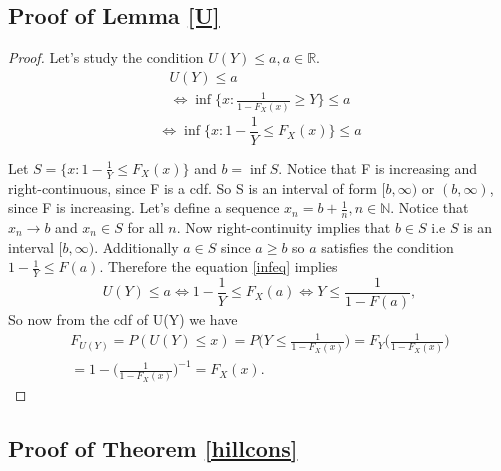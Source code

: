\documentclass[english,12pt,a4paper,pdftex,sci,utf8]{aaltothesis} %
\begin{document}
\subsection{Proof of Lemma \ref{U}}

\begin{proof}
Let's study the condition $U(Y) \leq a, a \in \mathbb{R} $.
\begin{equation*}
\begin{split}
U(Y) \leq a \\
\Leftrightarrow \inf\big\{x: \frac{1}{1-F_X(x)} \geq Y\big\} \leq a
\end{split}
\end{equation*}
\begin{equation}
\Leftrightarrow \inf\big\{x: 1 - \frac{1}{Y} \leq F_X(x)\big\} \leq a
\label{infeq}
\end{equation}


Let $S=\big\{x: 1 - \frac{1}{Y} \leq F_X(x)\big\}$ and $b = \inf S$. Notice that F is increasing and right-continuous, since F is a cdf. So S is an interval of form $[b,\infty)$ or $(b, \infty)$, since F is increasing. Let's define a sequence $x_n=b+\frac{1}{n}, n\in \mathbb{N}$. Notice that $x_n \rightarrow b$ and $x_n \in S$ for all $n$. Now right-continuity implies that $b \in S$ i.e $S$ is an interval $[b, \infty)$. Additionally $a \in S$ since $a\geq b$ so $a$ satisfies the condition $1-\frac{1}{Y} \leq F(a)$. Therefore the equation \ref{infeq} implies
\begin{equation*}
U(Y) \leq a \Leftrightarrow 1 - \frac{1}{Y} \leq F_X(a) \Leftrightarrow Y \leq \frac{1}{1-F(a)},
\end{equation*}
So now from the cdf of U(Y) we have
\begin{equation*}
\begin{split}
F_{U(Y)} = P(U(Y) \leq x) = P\Big(Y \leq \frac{1}{1-F_X(x)}\Big) = F_Y\Big(\frac{1}{1-F_X(x)}\Big) \\
= 1-\Big(\frac{1}{1-F_X(x)}\Big)^{-1} =F_X(x).
\end{split}
\end{equation*}
\end{proof}

\subsection{Proof of Theorem \ref{hillcons}}
\end{document}
